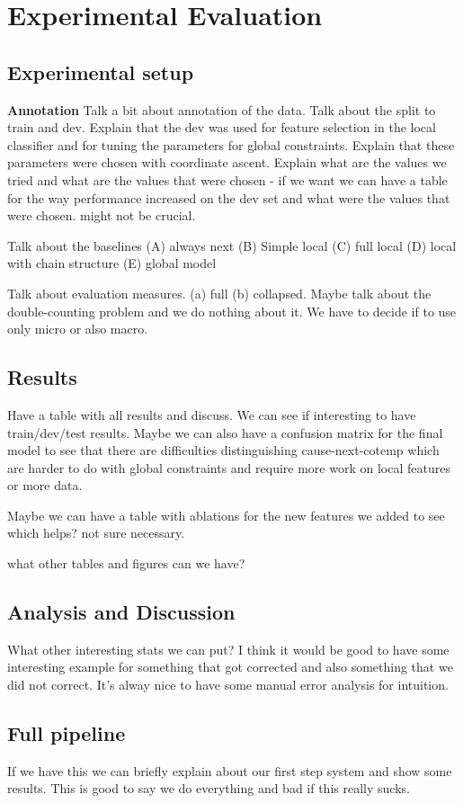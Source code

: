 \section{Experimental Evaluation}

\subsection{Experimental setup}

\textbf{Annotation} Talk a bit about annotation of the data. Talk about the split to train and dev. Explain that the dev was used for feature selection in the local classifier and for tuning the parameters for global constraints. Explain that these parameters were chosen with coordinate ascent. Explain what are the values we tried and what are the values that were chosen - if we want we can have a table for the way performance increased on the dev set and what were the values that were chosen. might not be crucial.

Talk about the baselines (A) always next (B) Simple local (C) full local (D) local with chain structure (E) global model

Talk about evaluation measures. (a) full (b) collapsed. Maybe talk about the double-counting problem and we do nothing about it. We have to decide if to use only micro or also macro. 

\subsection{Results}

Have a table with all results and discuss. We can see if interesting to have train/dev/test results. Maybe we can also have a confusion matrix for the final model to see that there are difficulties distinguishing cause-next-cotemp which are harder to do with global constraints and require more work on local features or more data.

Maybe we can have a table with ablations for the new features we added to see which helps? not sure necessary.

what other tables and figures can we have?

\subsection{Analysis and Discussion}

What other interesting stats we can put? I think it would be good to have some interesting example for something that got corrected and also something that we did not correct. It's alway nice to have some manual error analysis for intuition.

\subsection{Full pipeline}

If we have this we can briefly explain about our first step system and show some results. This is good to say we do everything and bad if this really sucks.



